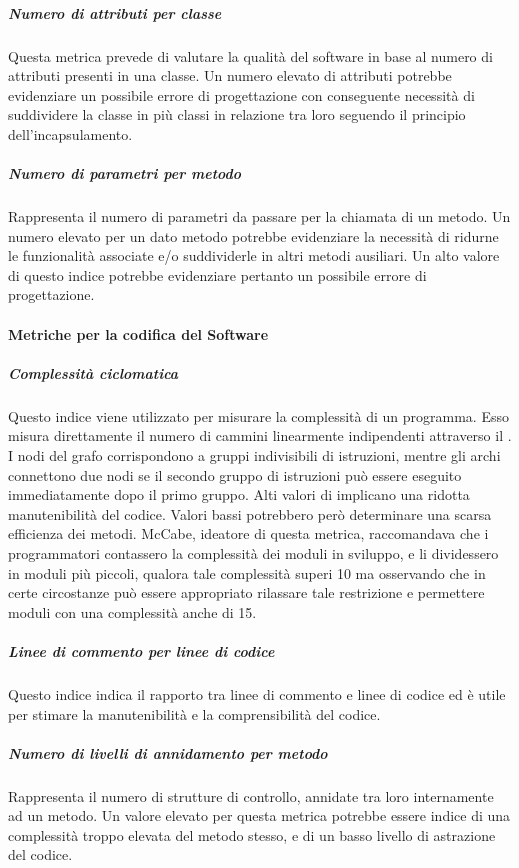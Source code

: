 \subparagraph{Numero di attributi per classe}
Questa metrica prevede di valutare la qualità del software in base al numero di attributi presenti in una classe.
Un numero elevato di attributi potrebbe evidenziare un possibile errore di progettazione con conseguente necessità di suddividere la classe in più classi in relazione tra loro seguendo il principio dell'incapsulamento.

\subparagraph{Numero di parametri per metodo}
Rappresenta il numero di parametri da passare per la chiamata di un metodo.
Un numero elevato per un dato metodo potrebbe evidenziare la necessità di ridurne le funzionalità associate e/o suddividerle in altri metodi ausiliari.
Un alto valore di questo indice potrebbe evidenziare pertanto un possibile errore di progettazione.

\paragraph{Metriche per la codifica del Software}

\subparagraph{Complessità ciclomatica}
Questo indice viene utilizzato per misurare la complessità di un programma. Esso misura direttamente il numero di cammini linearmente indipendenti attraverso il . I nodi del grafo corrispondono a gruppi indivisibili di istruzioni, mentre gli archi connettono due nodi se il secondo gruppo di istruzioni può essere eseguito immediatamente dopo il primo gruppo.
Alti valori di  implicano una ridotta manutenibilità del codice. Valori bassi potrebbero però determinare  una scarsa efficienza dei metodi. McCabe, ideatore di questa metrica, raccomandava che i programmatori contassero la complessità dei moduli in sviluppo, e li dividessero in moduli più piccoli, qualora tale complessità superi 10 ma osservando che in certe circostanze può essere appropriato rilassare tale restrizione e permettere moduli con una complessità anche di 15.

\subparagraph{Linee di commento per linee di codice}
Questo indice indica il rapporto tra linee di commento e linee di codice ed è utile per stimare la manutenibilità e la comprensibilità del codice. 

\subparagraph{Numero di livelli di annidamento per metodo}
Rappresenta il numero di strutture di controllo, annidate tra loro internamente ad un metodo.
Un valore elevato per questa metrica potrebbe essere indice di una complessità troppo elevata del metodo stesso, e di un basso livello di astrazione del codice.



